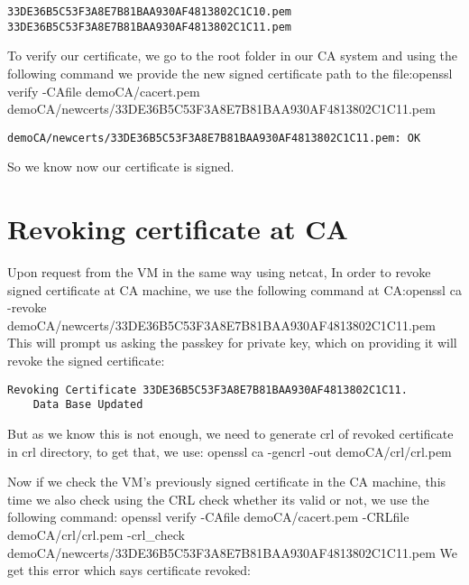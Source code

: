 \documentclass[11pt]{article}
\begin{document}
\begin{verbatim}
33DE36B5C53F3A8E7B81BAA930AF4813802C1C10.pem
33DE36B5C53F3A8E7B81BAA930AF4813802C1C11.pem
\end{verbatim}

To verify our certificate, we go to the root folder in our CA system and using the following command we provide the new signed certificate path to the file:\newline \newline openssl verify -CAfile demoCA/cacert.pem demoCA/newcerts/33DE36B5C53F3A8E7B81BAA930AF4813802C1C11.pem 

\begin{verbatim}
demoCA/newcerts/33DE36B5C53F3A8E7B81BAA930AF4813802C1C11.pem: OK
\end{verbatim}

So we know now our certificate is signed.

\section{Revoking certificate at CA}
Upon request from the VM in the same way using netcat, In order to revoke signed certificate at CA machine, we use the following command at CA:\newline \newline openssl ca -revoke demoCA/newcerts/33DE36B5C53F3A8E7B81BAA930AF4813802C1C11.pem \newline \newline This will prompt us asking the passkey for private key, which on providing it will revoke the signed certificate:

\begin{verbatim}
Revoking Certificate 33DE36B5C53F3A8E7B81BAA930AF4813802C1C11.
	Data Base Updated
\end{verbatim}

But as we know this is not enough, we need to generate crl of revoked certificate in crl directory, to get that, we use: \newline \newline  openssl ca -gencrl -out demoCA/crl/crl.pem \newline \newline

Now if we check the VM’s previously signed certificate in the CA machine, this time we also check using the CRL check whether its valid or not, we use the following command:  \newline \newline openssl verify -CAfile demoCA/cacert.pem -CRLfile demoCA/crl/crl.pem -crl\_check demoCA/newcerts/33DE36B5C53F3A8E7B81BAA930AF4813802C1C11.pem  \newline \newline We get this error which says certificate revoked: 
\end{document}
